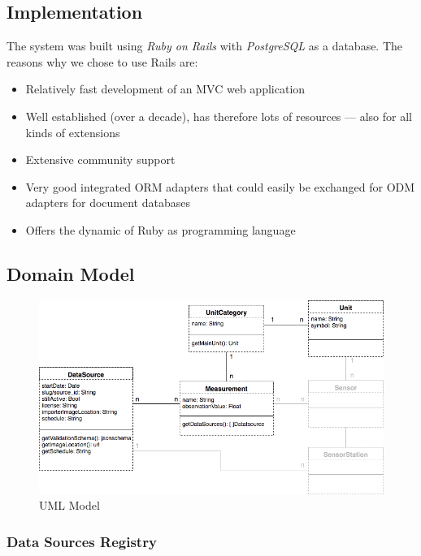 \subsection{Implementation}\label{implementation}

The system was built using \emph{Ruby on Rails} with \emph{PostgreSQL}
as a database. The reasons why we chose to use Rails are:

\begin{itemize}
\tightlist
\item
  Relatively fast development of an MVC web application
\item
  Well established (over a decade), has therefore lots of resources ---
  also for all kinds of extensions
\item
  Extensive community support
\item
  Very good integrated ORM adapters that could easily be exchanged for
  ODM adapters for document databases
\item
  Offers the dynamic of Ruby as programming language
\end{itemize}

\subsection{Domain Model}\label{domain-model}

\begin{figure}
	\includegraphics[width=1.00\textwidth]{images/relational_schema.png}
	\caption{UML Model}
	\label{fig:uml-model}
\end{figure}

\subsubsection{Data Sources Registry}\label{data-sources-registry}

